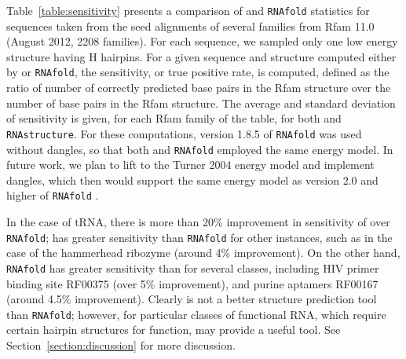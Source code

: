 Table~\ref{table:sensitivity} presents a comparison of {\rnahairpin}
and {\tt RNAfold} statistics for sequences taken from the seed alignments
of several families from Rfam 11.0 \citep{Burge.nar13}
(August 2012, 2208 families).  For each sequence,
we sampled only one low energy structure having H hairpins. For a given
sequence and structure computed either by {\rnahairpin} or {\tt RNAfold},
the sensitivity, or true positive rate, is computed, defined as
the ratio of number of correctly predicted base pairs in the
Rfam structure over the number of base pairs in the Rfam structure.
The average and standard deviation of sensitivity is given, for each
Rfam family of the table, for both {\rnahairpin} and {\tt RNAstructure}.
For these computations, version 1.8.5 of {\tt RNAfold} was used without
dangles, so that both {\rnahairpin} and {\tt RNAfold} employed the same
energy model. In future work, we plan to lift {\rnahairpin} to
the Turner 2004 energy model and implement dangles, which then would
support the same energy model as version 2.0 and higher of
{\tt RNAfold} \citep{Lorenz.amb11}.


In the case of tRNA, there is more than 20\% improvement in sensitivity
of {\rnahairpin} over {\tt RNAfold}; {\rnahairpin} has greater sensitivity
than {\tt RNAfold} for other instances, such as
in the case of the hammerhead ribozyme (around 4\% improvement).
On the other hand, {\tt RNAfold} has greater
sensitivity than {\rnahairpin} for several classes, including
HIV primer binding site RF00375 (over 5\% improvement), and
purine \rb aptamers RF00167 (around 4.5\% improvement).
Clearly {\rnahairpin} is not a better structure prediction tool than
{\tt RNAfold}; however, for particular classes of functional RNA,
which require certain hairpin structures for function, {\rnahairpin}
may provide a useful tool. See Section~\ref{section:discussion} for
more discussion.


